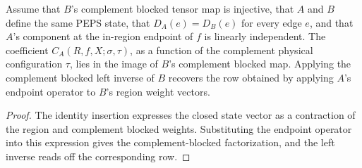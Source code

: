 \begin{theorem}
    \label{thm:peps_region_first_coeff_second_complement_block}
    \leanok
    Assume that \(B\)'s complement blocked tensor map is injective, that \(A\)
    and \(B\) define the same PEPS state, that \(D_A(e)=D_B(e)\) for every edge
    \(e\), and that \(A\)'s component at the in-region endpoint of \(f\) is
    linearly independent.
    The coefficient \(C_A(R,f,X;\sigma,\tau)\), as a function of the complement
    physical configuration \(\tau\), lies in the image of \(B\)'s complement
    blocked map.  Applying the complement blocked left inverse of \(B\) recovers
    the row obtained by applying \(A\)'s endpoint operator to \(B\)'s region weight
    vectors.
\end{theorem}
\begin{proof}\leanok
    The identity insertion expresses the closed state vector as a contraction of
    the region and complement blocked weights.  Substituting the endpoint operator
    into this expression gives the complement-blocked factorization, and the left
    inverse reads off the corresponding row.
\end{proof}

